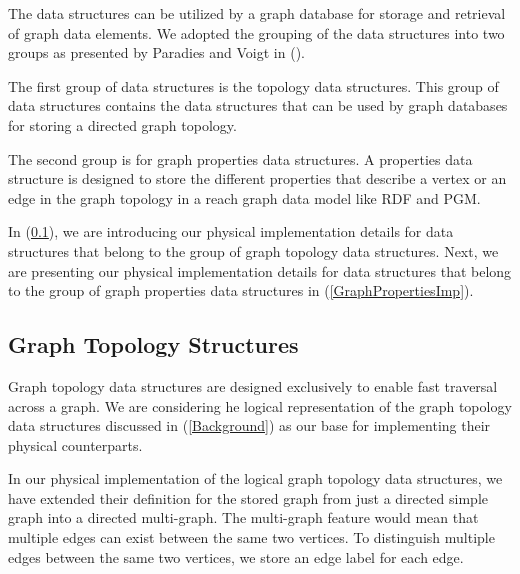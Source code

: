 {The data structures can be utilized by a graph database for storage and retrieval of graph data elements. We adopted the grouping of the data structures into two groups as presented by Paradies and Voigt in (\cite{Paradies2017}). 

The first group of data structures is the topology data structures. This group of data structures contains the data structures that can be used by graph databases for storing a directed graph topology.

The second group is for graph properties data structures. A properties data structure is designed to store the different properties that describe a vertex or an edge in the graph topology in a reach graph data model like RDF and PGM.

In (\ref{GraphTopolgyImp}), we are introducing our physical implementation details for data structures that belong to the group of graph topology data structures. Next, we are presenting our physical implementation details for data structures that belong to the group of graph properties data structures in (\ref{GraphPropertiesImp}).


\subsection{Graph Topology Structures}
\label{GraphTopolgyImp}

Graph topology data structures are designed exclusively to enable fast traversal across a graph. We are considering he logical representation of the graph topology data structures discussed in (\ref{Background}) as our base for implementing their physical counterparts. 

In our physical implementation of the logical graph topology data structures, we have extended their definition for the stored graph from just a directed simple graph into a directed multi-graph. The multi-graph feature would mean that multiple edges can exist between the same two vertices. To distinguish multiple edges between the same two vertices, we store an edge label for each edge.



}
